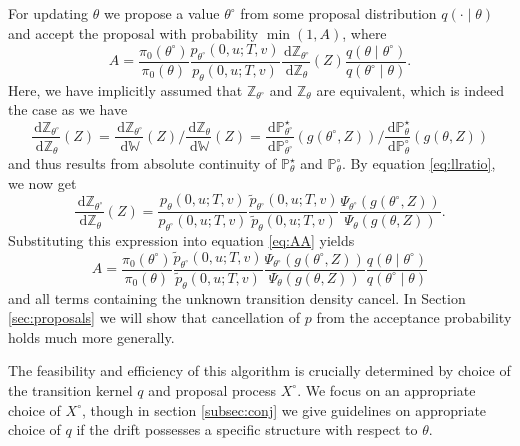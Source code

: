 \documentclass[preprint]{imsart}
\renewcommand{\th}{\theta}
\renewcommand{\tilde}{\widetilde}
\newcommand{\bb}[1]{\mathbb{#1}}
\theoremstyle{definition}
\newcommand{\dd}{{\,\mathrm d}}
\begin{document}
For updating $\th$ we propose a value ${\th^\circ}$ from some proposal distribution $q(\cdot \mid \th)$ and accept the proposal with probability $\min(1,A)$, where 
\begin{equation}
\label{eq:AA}
 A = \frac{\pi_0({\th^\circ})}{\pi_0(\theta)}\frac{p_{\th^\circ}(0,u; T,v)}{p_\theta(0,u; T,v)} \frac{\dd \bb{Z}_{\th^\circ}}{\dd \bb{Z}_\theta}(Z) \frac{q(\th \mid {\th^\circ})}{q({\th^\circ} \mid \theta)}. 
\end{equation}
Here, we have implicitly assumed that $\bb{Z}_{\th^\circ}$ and $\bb{Z}_\th$ are equivalent, which is indeed the case as  we have
\[	\frac{\dd \bb{Z}_{\th^\circ}}{\dd \bb{Z}_\th}(Z) =\frac{\dd \bb{Z}_{\th^\circ}}{\dd \bb{W}}(Z) \bigg/ \frac{\dd \bb{Z}_\th}{\dd \bb{W}}(Z)%
	= 
\frac{\dd \bb{P}^\star_{\th^\circ}}{\dd \bb{P}^\circ_{\th^\circ}} (g({\th^\circ}, Z)) \bigg/
\frac{\dd \bb{P}^\star_\theta}{\dd \bb{P}^\circ_\theta} (g(\theta, Z))
\]
and thus results from absolute continuity of $\bb{P}^\star_\th$ and $\bb{P}^\circ_\th$. 
By equation \eqref{eq:llratio}, we now get 
\[	\frac{\dd \bb{Z}_{\th^\circ}}{\dd \bb{Z}_\th}(Z)= \frac{p_\th(0,u; T,v)}{p_{\th^\circ}(0,u; T,v)} \frac{\tilde{p}_{\th^\circ}(0,u; T,v)}{\tilde{p}_\theta(0,u; T,v)}
 \frac{\Psi_{\th^\circ}(g({\th^\circ}, Z))}{\Psi_{ \theta}(g(\theta, Z))}. 
\]
Substituting this expression into equation \eqref{eq:AA} yields
\begin{equation} \label{eq:Atoy}
 A=  \frac{\pi_0({\th^\circ})}{\pi_0(\theta)} \frac{\tilde{p}_{\th^\circ}(0,u; T,v)}{\tilde{p}_\theta(0,u; T,v)}
 \frac{\Psi_{{\th^\circ}}(g({\th^\circ}, Z))}{\Psi_\th(g(\theta, Z))}  \frac{q(\th \mid {\th^\circ})}{q({\th^\circ} \mid \theta)}
\end{equation}
and all terms containing the unknown transition density cancel.  In Section \ref{sec:proposals} we will show that cancellation of $p$ from the acceptance probability holds much more generally. 

The feasibility and efficiency of this algorithm is crucially determined by  choice of the transition kernel $q$ and proposal process $X^\circ$. We focus  on an appropriate choice of $X^\circ$, though in section \ref{subsec:conj} we give guidelines on appropriate choice of $q$ if the drift possesses a specific structure with respect to $\theta$.
\end{document}
